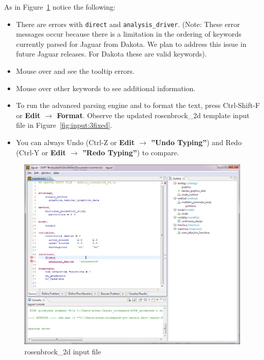 As in Figure~\ref{fig:input:2rosenbrockfile} notice the following:
\begin{itemize}      
\item There are errors with \texttt{direct} and \texttt{analysis\_driver}. (Note: These error messages occur because there is a limitation in the ordering of keywords currently parsed for Jaguar from Dakota. We plan to address this issue in future Jaguar releases. For Dakota these are valid keywords). 
\item Mouse over and see the tooltip errors.
\item Mouse over other keywords to see additional information.
\item To run the advanced parsing engine and to format the text, press Ctrl-Shift-F or {\bf Edit $\rightarrow$ Format}. Observe the updated rosenbrock\_2d template input file in Figure~\ref{fig:input:3fixed}. 
\item You can always Undo (Ctrl-Z or {\bf Edit $\rightarrow$ ''Undo Typing''}) and Redo (Ctrl-Y or {\bf Edit $\rightarrow$ ''Redo Typing''}) to compare.
\end{itemize}
\begin{figure}[htbp]
  \centering
  \includegraphics[scale=0.6]{images/2rosenbrockfile}
  \caption{rosenbrock\_2d input file}
  \label{fig:input:2rosenbrockfile}
\end{figure}

